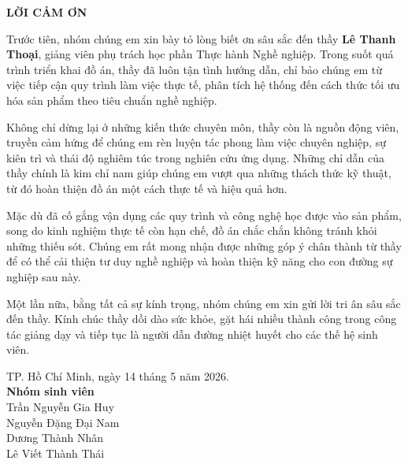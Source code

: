 \documentclass[a4paper,oneside]{book}
\begin{document}
\coverpage
\newpage

\thispagestyle{empty}
\vspace*{0.2cm}
\begin{center}
    \textbf{\Large LỜI CẢM ƠN}
\end{center}
\vspace{0.2cm}

Trước tiên, nhóm chúng em xin bày tỏ lòng biết ơn sâu sắc đến thầy \textbf{Lê Thanh Thoại}, giảng viên phụ trách học phần Thực hành Nghề nghiệp. Trong suốt quá trình triển khai đồ án, thầy đã luôn tận tình hướng dẫn, chỉ bảo chúng em từ việc tiếp cận quy trình làm việc thực tế, phân tích hệ thống đến cách thức tối ưu hóa sản phẩm theo tiêu chuẩn nghề nghiệp.

Không chỉ dừng lại ở những kiến thức chuyên môn, thầy còn là nguồn động viên, truyền cảm hứng để chúng em rèn luyện tác phong làm việc chuyên nghiệp, sự kiên trì và thái độ nghiêm túc trong nghiên cứu ứng dụng. Những chỉ dẫn của thầy chính là kim chỉ nam giúp chúng em vượt qua những thách thức kỹ thuật, từ đó hoàn thiện đồ án một cách thực tế và hiệu quả hơn.

Mặc dù đã cố gắng vận dụng các quy trình và công nghệ học được vào sản phẩm, song do kinh nghiệm thực tế còn hạn chế, đồ án chắc chắn không tránh khỏi những thiếu sót. Chúng em rất mong nhận được những góp ý chân thành từ thầy để có thể cải thiện tư duy nghề nghiệp và hoàn thiện kỹ năng cho con đường sự nghiệp sau này.

Một lần nữa, bằng tất cả sự kính trọng, nhóm chúng em xin gửi lời tri ân sâu sắc đến thầy. Kính chúc thầy dồi dào sức khỏe, gặt hái nhiều thành công trong công tác giảng dạy và tiếp tục là người dẫn đường nhiệt huyết cho các thế hệ sinh viên.

\vspace{0.5cm}
\begin{flushright}
TP. Hồ Chí Minh, ngày 14 tháng 5 năm 2026. \\
\vspace{0.5cm}
\textbf{Nhóm sinh viên} \\
Trần Nguyễn Gia Huy \\
Nguyễn Đặng Đại Nam \\
Dương Thành Nhân \\
Lê Viết Thành Thái
\end{flushright}
\newpage

\frontmatter
{}
\tableofcontents
\newpage

\mainmatter
{}

















\nocite{*}

\end{document}
